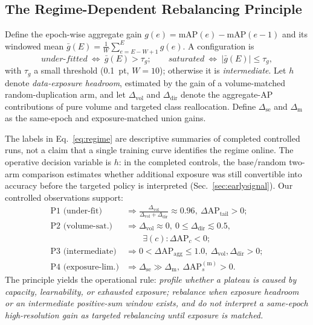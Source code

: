 \documentclass[journal]{IEEEtran}
\newcommand{\map}{\ensuremath{\mathrm{mAP}}}
\newcommand{\ap}{\ensuremath{\mathrm{AP}}}
\begin{document}
\subsection{The Regime-Dependent Rebalancing Principle}
\label{sec:principle}
Define the epoch-wise aggregate gain $g(e)=\map(e)-\map(e{-}1)$ and its windowed mean $\bar{g}(E)=\frac{1}{W}\sum_{e=E-W+1}^{E}g(e)$. A configuration is
\begin{equation}
\textit{under-fitted}\ \Leftrightarrow\ \bar{g}(E)>\tau_g;\qquad
\textit{saturated}\ \Leftrightarrow\ |\bar{g}(E)|\le\tau_g,
\label{eq:regime}
\end{equation}
with $\tau_g$ a small threshold (0.1~pt, $W{=}10$); otherwise it is \emph{intermediate}. Let $h$ denote \emph{data-exposure headroom}, estimated by the gain of a volume-matched random-duplication arm, and let $\Delta_{\mathrm{vol}}$ and $\Delta_{\mathrm{dir}}$ denote the aggregate-\ap{} contributions of pure volume and targeted class reallocation. Define $\Delta_{\mathrm{se}}$ and $\Delta_{\mathrm{m}}$ as the same-epoch and exposure-matched union gains.

The labels in Eq.~\eqref{eq:regime} are descriptive summaries of completed controlled runs, not a claim that a single training curve identifies the regime online. The operative decision variable is $h$: in the completed controls, the base/random two-arm comparison estimates whether additional exposure was still convertible into accuracy before the targeted policy is interpreted (Sec.~\ref{sec:earlysignal}). Our controlled observations support:
\begin{align}
\text{P1 (under-fit)} &\Rightarrow \tfrac{\Delta_{\mathrm{vol}}}{\Delta_{\mathrm{vol}}+\Delta_{\mathrm{dir}}}\approx0.96,\ \Delta\ap_{\mathrm{tail}}>0;\\
\text{P2 (volume-sat.)} &\Rightarrow \Delta_{\mathrm{vol}}\approx0,\ 0\le\Delta_{\mathrm{dir}}\lesssim0.5,\\
&\qquad \exists(c)\!:\!\Delta\ap_c<0;\\
\text{P3 (intermediate)} &\Rightarrow 0<\Delta\ap_{\mathrm{agg}}\le 1.0,\ \Delta_{\mathrm{vol}},\Delta_{\mathrm{dir}}>0;\\
\text{P4 (exposure-lim.)} &\Rightarrow \Delta_{\mathrm{se}}\gg\Delta_{\mathrm{m}},\ \Delta\ap_s^{(\mathrm{m})}>0.
\end{align}
The principle yields the operational rule: \emph{profile whether a plateau is caused by capacity, learnability, or exhausted exposure; rebalance when exposure headroom or an intermediate positive-sum window exists, and do not interpret a same-epoch high-resolution gain as targeted rebalancing until exposure is matched.}
\end{document}
